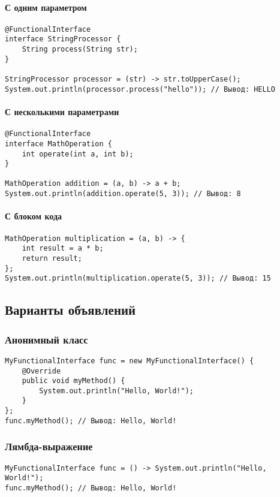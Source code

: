 \documentclass[12pt, a4paper]{article}
\begin{document}
\paragraph{С одним параметром}
\begin{verbatim}
@FunctionalInterface
interface StringProcessor {
    String process(String str);
}

StringProcessor processor = (str) -> str.toUpperCase();
System.out.println(processor.process("hello")); // Вывод: HELLO
\end{verbatim}

\paragraph{С несколькими параметрами}
\begin{verbatim}
@FunctionalInterface
interface MathOperation {
    int operate(int a, int b);
}

MathOperation addition = (a, b) -> a + b;
System.out.println(addition.operate(5, 3)); // Вывод: 8
\end{verbatim}

\paragraph{С блоком кода}
\begin{verbatim}
MathOperation multiplication = (a, b) -> {
    int result = a * b;
    return result;
};
System.out.println(multiplication.operate(5, 3)); // Вывод: 15
\end{verbatim}

\subsection*{Варианты объявлений}

\subsubsection*{Анонимный класс}
\begin{verbatim}
MyFunctionalInterface func = new MyFunctionalInterface() {
    @Override
    public void myMethod() {
        System.out.println("Hello, World!");
    }
};
func.myMethod(); // Вывод: Hello, World!
\end{verbatim}

\subsubsection*{Лямбда-выражение}
\begin{verbatim}
MyFunctionalInterface func = () -> System.out.println("Hello, World!");
func.myMethod(); // Вывод: Hello, World!
\end{verbatim}
\end{document}
